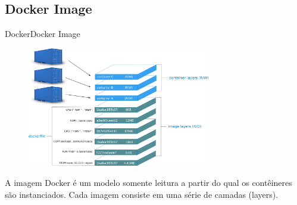 \subsection{Docker Image}
\begin{frame}{Docker}{Docker Image}
  \begin{figure}[ht!]
    \centering
    \includegraphics[width=80mm]{images/image.png}
  \end{figure}
  A imagem Docker é um modelo somente leitura a partir do qual os contêineres são instanciados. Cada imagem consiste em uma série de camadas (layers).
\end{frame}
